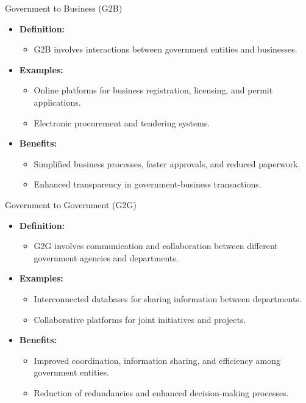 \begin{frame}{Government to Business (G2B)}
  \begin{itemize}
    \item \textbf{Definition:}
      \begin{itemize}
        \item G2B involves interactions between government entities and businesses.
      \end{itemize}
    \item \textbf{Examples:}
      \begin{itemize}
        \item Online platforms for business registration, licensing, and permit applications.
        \item Electronic procurement and tendering systems.
      \end{itemize}
    \item \textbf{Benefits:}
      \begin{itemize}
        \item Simplified business processes, faster approvals, and reduced paperwork.
        \item Enhanced transparency in government-business transactions.
      \end{itemize}
  \end{itemize}
\end{frame}

\begin{frame}{Government to Government (G2G)}
  \begin{itemize}
    \item \textbf{Definition:}
      \begin{itemize}
        \item G2G involves communication and collaboration between different government agencies and departments.
      \end{itemize}
    \item \textbf{Examples:}
      \begin{itemize}
        \item Interconnected databases for sharing information between departments.
        \item Collaborative platforms for joint initiatives and projects.
      \end{itemize}
    \item \textbf{Benefits:}
      \begin{itemize}
        \item Improved coordination, information sharing, and efficiency among government entities.
        \item Reduction of redundancies and enhanced decision-making processes.
      \end{itemize}
  \end{itemize}
\end{frame}

